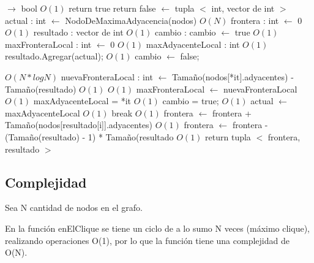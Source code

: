 \documentclass[a4paper, 10pt, twoside]{article}
\newenvironment{pseudo}[1][]{%
    \vspace{1em}%
    \begin{algorithmic}%
}
{%
    \end{algorithmic}%
    \vspace{1em}%
}
\newcommand{\Ode}[1]{\hfill $O(#1)$}
\begin{document}
\begin{pseudo}
 $\rightarrow$ bool
																											\Ode{1}
			\State return true
		\EndIf
	\EndFor
	\State return false
\EndProcedure
\State
{} $\leftarrow$ tupla $<$ int, vector de int $>$
	\State actual : int $\leftarrow$ NodoDeMaximaAdyacencia(nodos)									\Ode{N}
	\State frontera : int $\leftarrow$ 0																					\Ode{1}
	\State resultado : vector de int																						\Ode{1}
	\State cambio : cambio $\leftarrow$ true																			\Ode{1}
		\State maxFronteraLocal : int $\leftarrow$ 0  \Ode{1}
	 	\State maxAdyacenteLocal : int  \Ode{1}
	 	\State resultado.Agregar(actual);  \Ode{1}
	 	\State cambio $\leftarrow$ false;
	 	
	 		 \Ode{N*log N}
	 			\State nuevaFronteraLocal : int $\leftarrow$ Tamaño(nodos[*it].adyacentes) - Tamaño(resultado) 																													\Ode{1}
	 																\Ode{1}
	 				\State maxFronteraLocal $\leftarrow$ nuevaFronteraLocal							\Ode{1}
	 				\State maxAdyacenteLocal = *it																		\Ode{1}
	 				\State cambio = true;																						\Ode{1}
	 			\EndIf
	 		\EndIf
	 	\EndFor
	 	\State actual $\leftarrow$ maxAdyacenteLocal															\Ode{1}
	 	 break \EndIf																								\Ode{1}
	\EndWhile
 		\State frontera $\leftarrow$ frontera + Tamaño(nodos[resultado[i]].adyacentes)	\Ode{1}
 	\EndFor
 	\State frontera $\leftarrow$ frontera - (Tamaño(resultado) - 1) * Tamaño(resultado \Ode{1}
	\State return tupla $<$ frontera, resultado $>$
\EndProcedure

\end{pseudo}

\subsection{Complejidad}
Sea N cantidad de nodos en el grafo.

En la función enElClique se tiene un ciclo de a lo sumo N veces (máximo clique), realizando operaciones O(1), por lo que la función tiene una complejidad de O(N).
\end{document}
